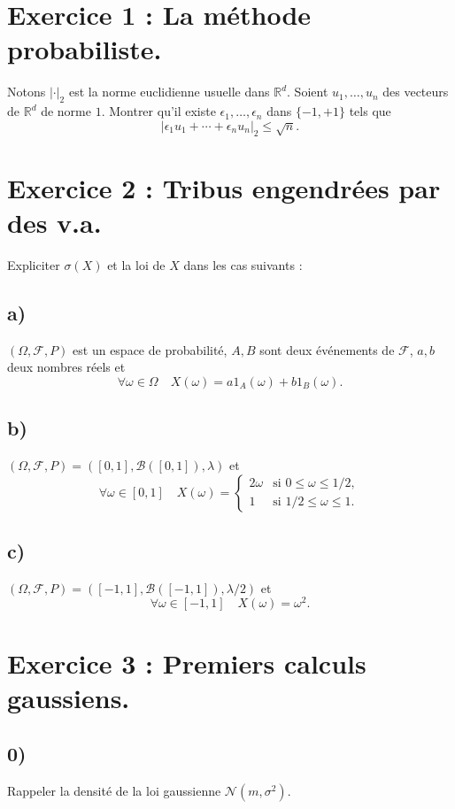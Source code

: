 \documentclass[12pt,a4paper]{article}
\begin{document}
\section*{Exercice 1 : La méthode probabiliste.}

Notons $|\cdot|_2$ est la norme euclidienne usuelle dans $\mathbb{R}^d$.  
Soient $u_1, \ldots, u_n$ des vecteurs de $\mathbb{R}^d$ de norme $1$. Montrer qu’il existe $\epsilon_1, \ldots, \epsilon_n$ dans $\{-1,+1\}$ tels que
\[
|\epsilon_1 u_1 + \cdots + \epsilon_n u_n|_2 \leq \sqrt{n}.
\]

\section*{Exercice 2 : Tribus engendrées par des v.a.}

Expliciter $\sigma(X)$ et la loi de $X$ dans les cas suivants :  

\subsection*{a)} 
$(\Omega,\mathcal{F},P)$ est un espace de probabilité, $A,B$ sont deux événements de $\mathcal{F}$, $a,b$ deux nombres réels et
\[
\forall \omega \in \Omega \quad X(\omega) = a 1_A(\omega) + b 1_B(\omega).
\]

\subsection*{b)} 
$(\Omega,\mathcal{F},P) = ([0,1],\mathcal{B}([0,1]),\lambda)$ et
\[
\forall \omega \in [0,1] \quad 
X(\omega) = 
\begin{cases}
2\omega & \text{si } 0 \leq \omega \leq 1/2, \\
1 & \text{si } 1/2 \leq \omega \leq 1.
\end{cases}
\]

\subsection*{c)} 
$(\Omega,\mathcal{F},P) = ([-1,1],\mathcal{B}([-1,1]),\lambda/2)$ et
\[
\forall \omega \in [-1,1] \quad X(\omega) = \omega^2.
\]

\section*{Exercice 3 : Premiers calculs gaussiens.}

\subsection*{0)} Rappeler la densité de la loi gaussienne $\mathcal{N}(m,\sigma^2)$.  
\end{document}
